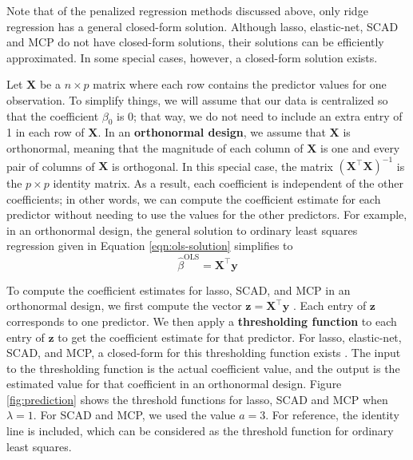 \documentclass{article}
\begin{document}
Note that of the penalized regression methods discussed above, only ridge regression has a general closed-form solution. Although lasso, elastic-net, SCAD and MCP do not have closed-form solutions, their solutions can be efficiently approximated. In some special cases, however, a closed-form solution exists. 

Let $\mathbf{X}$ be a $n\times p$ matrix where each row contains the predictor values for one observation. To simplify things, we will assume that our data is centralized so that the coefficient $\beta_0$ is 0; that way, we do not need to include an extra entry of 1 in each row of $\mathbf{X}$. In an \textbf{orthonormal design}, we assume that $\mathbf{X}$ is orthonormal, meaning that the magnitude of each column of $\mathbf{X}$ is one and every pair of columns of $\mathbf{X}$ is orthogonal. In this special case, the matrix $(\mathbf{X}^\top \mathbf{X})^{-1}$ is the $p\times p$ identity matrix. As a result, each coefficient is independent of the other coefficients; in other words, we can compute the coefficient estimate for each predictor without needing to use the values for the other predictors. For example, in an orthonormal design, the general solution to ordinary least squares regression given in Equation \ref{eqn:ols-solution} simplifies to
\begin{equation}\label{ols-orthonormal-solution}
	\hat{\beta}^{\text{OLS}} = \mathbf{X}^\top \mathbf{y}
\end{equation}

To compute the coefficient estimates for lasso, SCAD, and MCP in an orthonormal design, we first compute the vector $\mathbf{z} = \mathbf{X}^\top \mathbf{y}$ \cite{fan2001variable}. Each entry of $\mathbf{z}$ corresponds to one predictor. We then apply a \textbf{thresholding function} to each entry of $\mathbf{z}$ to get the coefficient estimate for that predictor. For lasso, elastic-net, SCAD, and MCP, a closed-form for this thresholding function exists \cite{tibshirani1996regression, fan2001variable, zou2005regularization, zhang2010nearly}. The input to the thresholding function is the actual coefficient value, and the output is the estimated value for that coefficient in an orthonormal design. Figure \ref{fig:prediction} shows the threshold functions for lasso, SCAD and MCP when $\lambda = 1$. For SCAD and MCP, we used the value $a = 3$. For reference, the identity line is included, which can be considered as the threshold function for ordinary least squares.
\end{document}
